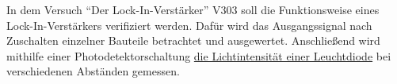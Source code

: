 In dem Versuch \enquote{Der Lock-In-Verstärker} V303 soll die Funktionsweise eines Lock-In-Verstärkers verifiziert werden.
Dafür wird das Ausgangssignal nach Zuschalten einzelner Bauteile betrachtet und ausgewertet. Anschließend wird
mithilfe einer Photodetektorschaltung \uline{die Lichtintensität einer Leuchtdiode} bei verschiedenen Abständen gemessen.
